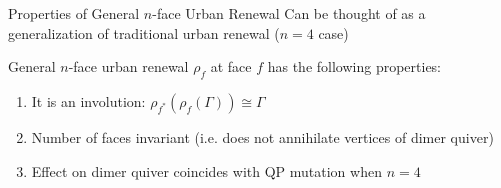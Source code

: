 \begin{frame}{Properties of General $n$-face Urban Renewal}
    Can be thought of as a generalization of traditional urban renewal ($n = 4$ case) \cite[Section~2.5]{fominIntroductionClusterAlgebras2021a}

    \begin{theorem}
        General $n$-face urban renewal $\rho_f$ at face $f$ has the following properties:
        \begin{enumerate}
            \item It is an involution: $\rho_{f^*}(\rho_f(\Gamma)) \cong \Gamma$
            
            \vspace{0.5cm}
    
            \item Number of faces invariant (i.e. does not annihilate vertices of dimer quiver)
            
            \vspace{0.5cm}
    
            \item Effect on dimer quiver coincides with QP mutation when $n = 4$
        \end{enumerate}
    \end{theorem}
\end{frame}
